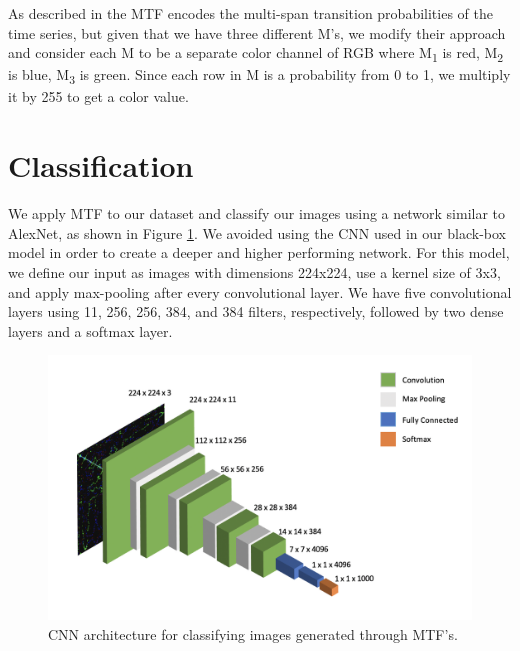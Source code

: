 \documentclass{turabian-thesis}
\begin{document}
As described in \cite{wang_encoding_nodate} the MTF encodes the multi-span transition probabilities of the time series, but given that we have three different M's, we modify their approach and consider each M to be a separate color channel of RGB where M\textsubscript{1} is red, M\textsubscript{2} is blue, M\textsubscript{3} is green. Since each row in M is a probability from 0 to 1, we multiply it by 255 to get a color value.





\section{Classification}
We apply MTF to our dataset and classify our images using a network similar to AlexNet, as shown in Figure \ref{fig:mtf_cnn_model}. We avoided using the CNN used in our black-box model in order to create a deeper and higher performing network. For this model, we define our input as images with dimensions 224x224, use a kernel size of 3x3, and apply max-pooling after every convolutional layer. We have five convolutional layers using 11, 256, 256, 384, and 384 filters, respectively, followed by two dense layers and a softmax layer.
\begin{figure}[h!]
   \begin{center}
      \includegraphics[scale=.7]{../media/2d_cnn.png}
   \end{center}
   \caption{CNN architecture for classifying images generated through MTF's.}
   \label{fig:mtf_cnn_model}
\end{figure}

\end{document}
